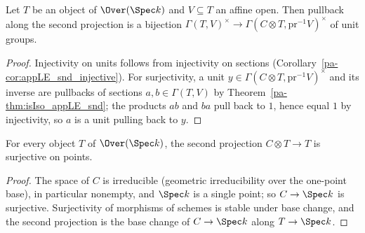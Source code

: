 \begin{corollary}
  \label{pa-cor:unitsAppLE_snd_bijective}
  \leanok

  Let \(T\) be an object of \(\Over(\Spec k)\) and \(V \subseteq T\) an affine open. Then
  pullback along the second projection is a bijection
  \(\Gamma(T, V)^{\times} \to \Gamma(C \otimes T, \mathrm{pr}^{-1}V)^{\times}\) of unit
  groups.
\end{corollary}
\begin{proof}
  \leanok
  Injectivity on units follows from injectivity on sections
  (Corollary~\ref{pa-cor:appLE_snd_injective}). For surjectivity, a unit
  \(y \in \Gamma(C \otimes T, \mathrm{pr}^{-1}V)^{\times}\) and its inverse are pullbacks of
  sections \(a, b \in \Gamma(T,V)\) by Theorem~\ref{pa-thm:isIso_appLE_snd}; the products
  \(ab\) and \(ba\) pull back to \(1\), hence equal \(1\) by injectivity, so \(a\) is a unit
  pulling back to \(y\).
\end{proof}

\begin{lemma}
  \label{pa-lem:surjective_snd}
  \leanok

  For every object \(T\) of \(\Over(\Spec k)\), the second projection
  \(C \otimes T \to T\) is surjective on points.
\end{lemma}
\begin{proof}
  \leanok
  The space of \(C\) is irreducible (geometric irreducibility over the one-point base), in
  particular nonempty, and \(\Spec k\) is a single point; so \(C \to \Spec k\) is
  surjective. Surjectivity of morphisms of schemes is stable under base change, and the
  second projection is the base change of \(C \to \Spec k\) along \(T \to \Spec k\).
\end{proof}

